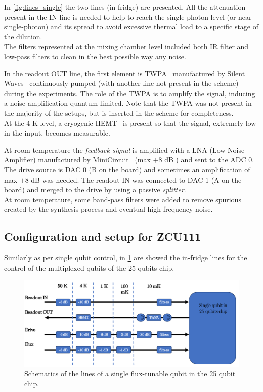 In \cref{fig:lines_single} the two lines (in-fridge) are presented.
All the attenuation present in the IN line is needed to help to reach the single-photon level (or near-single-photon) and its spread to avoid excessive thermal load to a specific stage of the dilution.\\
The filters represented at the mixing chamber level included both IR filter and low-pass filters to clean in the best possible way any noise.

In the readout OUT line, the first element is TWPA~\cite{Yaakobi2013} manufactured by Silent Waves~\cite{silentwaves} continuously pumped (with another line not present in the scheme) during the experiments.
The role of the TWPA is to amplify the signal, inducing a noise amplification quantum limited.
Note that the TWPA was not present in the majority of the setups, but is inserted in the scheme for completeness.\\
At the $4$ K level, a cryogenic HEMT~\cite{Baulieu2022} is present so that the signal, extremely low in the input, becomes measurable.

At room temperature the \textit{feedback signal} is amplified with a LNA (Low Noise Amplifier) manufactured by MiniCircuit~\cite{minicircuit} (max $+8$ dB ) and sent to the \RFSoC ADC 0.\\
The drive source is DAC 0 (B on the board) and sometimes an amplification of max $+8$ dB was needed.
The readout IN was connected to DAC 1 (A on the board) and merged to the drive by using a passive \textit{splitter}.\\
At room temperature, some band-pass filters were added to remove spurious created by the synthesis process and eventual high frequency noise.


\subsection{Configuration and setup for ZCU111}

Similarly as per single qubit control, in \cref{fig:lines_zcu} are showed the in-fridge lines for the control of the multiplexed qubits of the 25 qubits chip. 

\begin{figure}[ht]
    \centering
    \includegraphics[width=\textwidth]{Setup-software/figures/scheme_lines_25.pdf}
    \caption{Schematics of the lines of a single flux-tunable qubit in the 25 qubit chip.}
    \label{fig:lines_zcu}
\end{figure}

